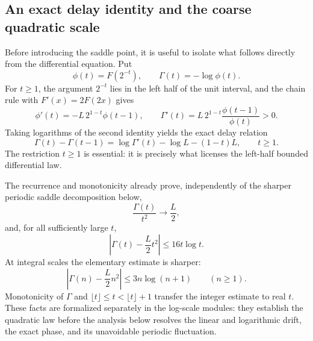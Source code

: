 \documentclass[11pt,oneside]{article}
\theoremstyle{definition}
\theoremstyle{remark}
\begin{document}
\subsection{An exact delay identity and the coarse quadratic scale}

Before introducing the saddle point, it is useful to isolate what follows directly from the
differential equation.  Put
\begin{equation}
 \phi(t)=F(2^{-t}),\qquad \Gamma(t)=-\log\phi(t).           \label{eq:log-scale-def}
\end{equation}
For $t\ge1$, the argument $2^{-t}$ lies in the left half of the unit interval, and the chain
rule with $F'(x)=2F(2x)$ gives
\begin{equation}
 \phi'(t)=-L\,2^{1-t}\phi(t-1),\qquad
 \Gamma'(t)=L\,2^{1-t}\frac{\phi(t-1)}{\phi(t)}>0.        \label{eq:log-scale-derivative}
\end{equation}
Taking logarithms of the second identity yields the exact delay relation
\begin{equation}
 \boxed{\Gamma(t)-\Gamma(t-1)
 =\log\Gamma'(t)-\log L-(1-t)L,\qquad t\ge1.}             \label{eq:log-scale-delay}
\end{equation}
The restriction $t\ge1$ is essential: it is precisely what licenses the left-half bounded
differential law.

The recurrence and monotonicity already prove, independently of the sharper periodic saddle
decomposition below,
\begin{equation}
 \frac{\Gamma(t)}{t^2}\longrightarrow\frac L2,             \label{eq:coarse-log-square}
\end{equation}
and, for all sufficiently large $t$,
\begin{equation}
 \left|\Gamma(t)-\frac L2t^2\right|\le16t\log t.           \label{eq:coarse-log-error}
\end{equation}
At integral scales the elementary estimate is sharper:
\begin{equation}
 \left|\Gamma(n)-\frac L2n^2\right|
 \le3n\log(n+1)\qquad(n\ge1).                              \label{eq:integer-log-error}
\end{equation}
Monotonicity of $\Gamma$ and $\lfloor t\rfloor\le t<\lfloor t\rfloor+1$ transfer the
integer estimate to real $t$.  These facts are formalized separately in the log-scale
modules: they establish the quadratic law before the analysis below resolves the linear and
logarithmic drift, the exact phase, and its unavoidable periodic fluctuation.
\end{document}
